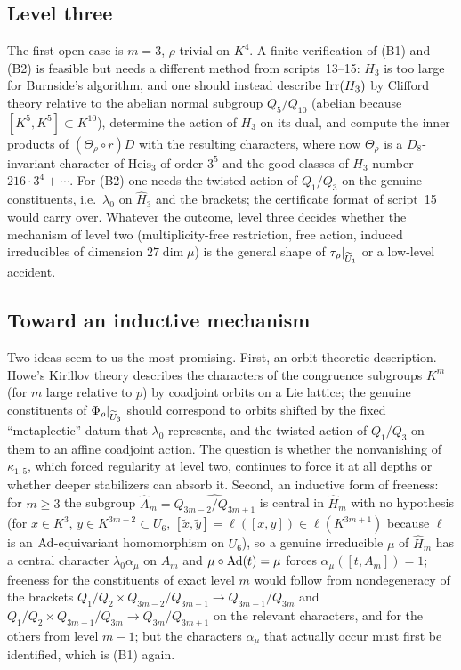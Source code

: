 \subsection{Level three}
The first open case is $m=3$, $\rho$ trivial on $K^4$.  A finite
verification of (B1) and (B2) is feasible but needs a different method
from scripts~13--15: $H_3$ is too large for Burnside's algorithm, and
one should instead describe $\operatorname{Irr}(H_3)$ by Clifford theory relative to
the abelian normal subgroup $Q_5/Q_{10}$ (abelian because
$[K^5,K^5]\subset K^{10}$), determine the action of $H_3$ on its dual,
and compute the inner products of $(\Theta_\rho\circ r)D$ with the
resulting characters, where now $\Theta_\rho$ is a $D_8$-invariant
character of $\mathrm{Heis}_3$ of order $3^5$ and the good classes of
$H_3$ number $216\cdot3^4+\cdots$.  For (B2) one needs the twisted
action of $Q_1/Q_3$ on the genuine constituents, i.e.\ $\lambda_0$ on
$\hat H_3$ and the brackets; the certificate format of script~15 would
carry over.  Whatever the outcome, level three decides whether the
mechanism of level two (multiplicity-free restriction, free action,
induced irreducibles of dimension $27\dim\mu$) is the general shape of
$\tau_\rho|_{\widetilde U_1}$ or a low-level accident.

\subsection{Toward an inductive mechanism}
Two ideas seem to us the most promising.  First, an orbit-theoretic
description.  Howe's Kirillov theory \cite{How77a} describes the characters
of the congruence subgroups $K^m$ (for $m$ large relative to $p$) by
coadjoint orbits on a Lie lattice; the genuine constituents of
$\Phi_\rho|_{\widetilde U_3}$ should correspond to orbits shifted by the fixed
``metaplectic'' datum that $\lambda_0$ represents, and the twisted
action of $Q_1/Q_3$ on them to an affine coadjoint action.  The question
is whether the nonvanishing of $\kappa_{1,5}$, which forced regularity
at level two, continues to force it at all depths or whether deeper
stabilizers can absorb it.  Second, an inductive form of freeness: for
$m\ge3$ the subgroup $\hat A_m=\widehat{Q_{3m-2}/Q_{3m+1}}$ is central in
$\hat H_m$ with no hypothesis (for $x\in K^3$, $y\in K^{3m-2}\subset U_6$,
$[\tilde x,\tilde y]=\ell([x,y])\in\ell(K^{3m+1})$ because $\ell$ is an
$\operatorname{Ad}$-equivariant homomorphism on $U_6$), so a genuine irreducible
$\mu$ of $\hat H_m$ has a central character $\lambda_0\alpha_\mu$ on
$\hat A_m$ and $\mu\circ\operatorname{Ad}(t)=\mu$ forces $\alpha_\mu([t,A_m])=1$;
freeness for the constituents of exact level $m$ would follow from
nondegeneracy of the brackets $Q_1/Q_2\times Q_{3m-2}/Q_{3m-1}\to Q_{3m-1}/Q_{3m}$
and $Q_1/Q_2\times Q_{3m-1}/Q_{3m}\to Q_{3m}/Q_{3m+1}$ on the relevant
characters, and for the others from level $m-1$; but the characters
$\alpha_\mu$ that actually occur must first be identified, which is
(B1) again.


